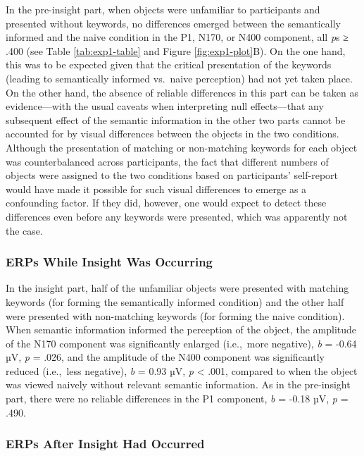 \documentclass[
  english,
  doc,12pt,twoside,floatsintext]{apa7}
\begin{document}
In the pre-insight part, when objects were unfamiliar to participants and presented without keywords, no differences emerged between the semantically informed and the naive condition in the P1, N170, or N400 component, all \emph{p}s ≥ .400 (see Table \ref{tab:exp1-table} and Figure \ref{fig:exp1-plot}B). On the one hand, this was to be expected given that the critical presentation of the keywords (leading to semantically informed vs.~naive perception) had not yet taken place. On the other hand, the absence of reliable differences in this part can be taken as evidence---with the usual caveats when interpreting null effects---that any subsequent effect of the semantic information in the other two parts cannot be accounted for by visual differences between the objects in the two conditions. Although the presentation of matching or non-matching keywords for each object was counterbalanced across participants, the fact that different numbers of objects were assigned to the two conditions based on participants' self-report would have made it possible for such visual differences to emerge as a confounding factor. If they did, however, one would expect to detect these differences even before any keywords were presented, which was apparently not the case.

\hypertarget{erps-while-insight-was-occurring}{%
\subsubsection{ERPs While Insight Was Occurring}\label{erps-while-insight-was-occurring}}

In the insight part, half of the unfamiliar objects were presented with matching keywords (for forming the semantically informed condition) and the other half were presented with non-matching keywords (for forming the naive condition). When semantic information informed the perception of the object, the amplitude of the N170 component was significantly enlarged (i.e.,~more negative), \emph{b} = -0.64 µV, \emph{p} = .026, and the amplitude of the N400 component was significantly reduced (i.e.,~less negative), \emph{b} = 0.93 µV, \emph{p} \textless{} .001, compared to when the object was viewed naively without relevant semantic information. As in the pre-insight part, there were no reliable differences in the P1 component, \emph{b} = -0.18 µV, \emph{p} = .490.

\hypertarget{erps-after-insight-had-occurred}{%
\subsubsection{ERPs After Insight Had Occurred}\label{erps-after-insight-had-occurred}}
\end{document}

